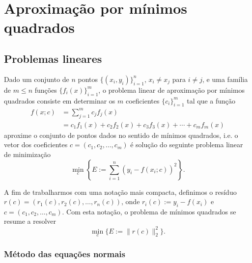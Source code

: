 
\chapter{Aproximação por mínimos quadrados}\label{cap_ajuste}
\thispagestyle{fancy}

\section{Problemas lineares}\label{cap_ajuste_sec_prob_lin}

Dado um conjunto de $n$ pontos $\{(x_i,y_i)\}_{i=1}^n$, $x_i\neq x_j$ para $i\neq j$, e uma família de $m \leq n$ funções $\{f_i(x)\}_{i=1}^m$, o problema linear de aproximação por mínimos quadrados consiste em determinar os $m$ coeficientes $\{c_i\}_{i=1}^m$ tal que a função
\begin{align}    
  f(x;c) &= \sum_{j=1}^m c_jf_j(x) \\
         &= c_1f_1(x) + c_2f_2(x) + c_3f_3(x) + \cdots + c_mf_m(x)
\end{align}
aproxime o conjunto de pontos dados no sentido de mínimos quadrados, i.e. o vetor dos coeficientes $c = (c_1, c_2, \dotsc, c_m)$ é solução do seguinte problema linear de minimização
\begin{equation}
  \min_{c} \left\{E:= \sum_{i=1}^n (y_i - f(x_i;c))^2\right\}.
\end{equation}

A fim de trabalharmos com uma notação mais compacta, definimos o resíduo $r(c) = (r_1(c), r_2(c), \dotsc, r_n(c))$, onde $r_i(c) := y_i - f(x_i)$ e $c = (c_1, c_2, \dotsc, c_m)$. Com esta notação, o problema de mínimos quadrados se resume a resolver
\begin{equation}\label{eq:pmq}
  \min_{c} \{E := \|r(c)\|_2^2\}.
\end{equation}

\subsection{Método das equações normais}

